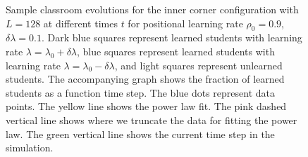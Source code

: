 \begin{figure}[htbp!]
   \caption{Sample classroom evolutions for the inner corner configuration with $L=128$ at different times $t$ for positional learning rate $\rho_0=0.9$, $\delta\lambda = 0.1$.
   Dark blue squares represent learned students with learning rate $\lambda = \lambda_0 + \delta\lambda$, blue squares represent learned students with learning rate $\lambda = \lambda_0 - \delta\lambda$, and light squares represent unlearned students.
   The accompanying graph shows the fraction of learned students as a function time step.
   The blue dots represent data points. 
   The yellow line shows the power law fit.
   The pink dashed vertical line shows where we truncate the data for fitting the power law.
   The green vertical line shows the current time step in the simulation.
   }
   \label{fig:2DBPCAIH sample class evolution high rho}
\end{figure}

